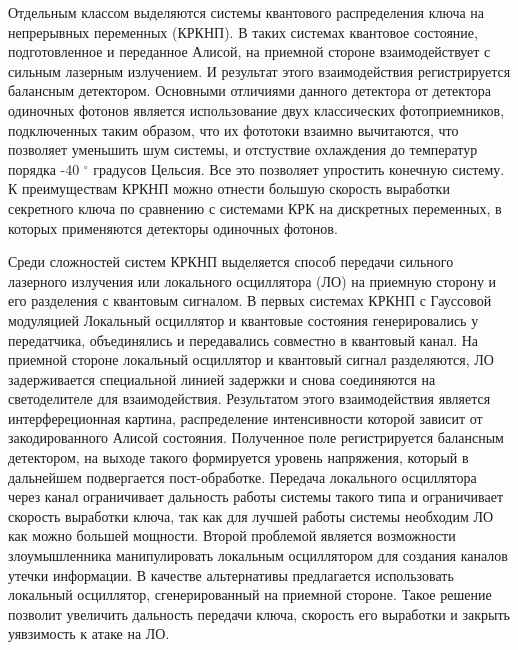 Отдельным классом выделяются системы квантового распределения ключа на непрерывных переменных (КРКНП). В таких системах квантовое состояние, подготовленное и переданное Алисой, на приемной стороне взаимодействует с сильным лазерным излучением. И результат этого взаимодействия регистрируется балансным детектором. Основными отличиями данного детектора от детектора одиночных фотонов является использование двух классических фотоприемников, подключенных таким образом, что их фототоки взаимно вычитаются, что позволяет уменьшить шум системы,  и отстуствие охлаждения до температур порядка -40 $^{\circ}$  градусов Цельсия. Все это позволяет упростить конечную систему. К преимуществам КРКНП можно отнести большую скорость выработки секретного ключа по сравнению с системами КРК на дискретных переменных, в которых применяются детекторы одиночных фотонов. 

Среди сложностей систем КРКНП выделяется способ передачи сильного лазерного излучения или локального осциллятора (ЛО) на приемную сторону и его разделения с квантовым сигналом. В первых системах КРКНП с Гауссовой модуляцией Локальный осциллятор и квантовые состояния  генерировались у передатчика, объединялись и передавались совместно в квантовый канал. На приемной стороне локальный осциллятор и квантовый сигнал разделяются, ЛО задерживается специальной линией задержки и снова соединяются на светоделителе для взаимодействия. Результатом этого взаимодействия является интерфереционная картина, распределение интенсивности которой зависит от закодированного Алисой состояния. Полученное поле регистрируется балансным детектором, на выходе такого формируется уровень напряжения, который в дальнейшем подвергается пост-обработке.  Передача локального осциллятора через канал ограничивает дальность работы системы такого типа и ограничивает скорость выработки ключа, так как для лучшей работы системы необходим ЛО как можно большей мощности. Второй проблемой является возможности злоумышленника манипулировать локальным осциллятором для создания каналов утечки информации. В качестве альтернативы предлагается использовать локальный осциллятор, сгенерированный на приемной стороне. Такое решение позволит увеличить дальность передачи ключа, скорость его выработки и закрыть уявзимость к атаке на ЛО.


